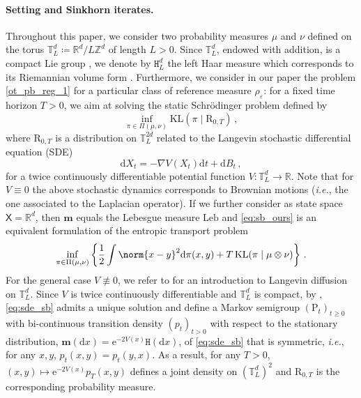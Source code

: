 \documentclass[final,12pt]{colt2023} %
\def\msx{\mathsf{X}}
\def\rset{\mathbb{R}}
\def\ie{\textit{i.e.}}
\newcommand{\bbRD}{\mathbb{R}^d}
\newcommand{\De}{\mathrm{d}}
\newcommand{\rmP}{\mathrm{P}}
\newcommand{\rmR}{\mathrm{R}}
\newcommand{\rme}{\mathrm{e}}
\def\torus{\tset}
\def\torusL{\torus_L}
\def\Haar{\mathtt{H}}
\def\HaarL{\Haar_L}
\newcommand{\defEns}[1]{\left\lbrace #1 \right\rbrace }
\def\rset{\mathbb{R}}
\def\tset{\mathbb{T}}
\def\ie{\textit{i.e.}}
\def\bfm{\mathbf{m}}
\def\rmd{\mathrm{d}}
\def\Leb{\mathrm{Leb}}
\begin{document}
\paragraph{Setting and Sinkhorn iterates.}Throughout this paper, we consider two probability measures $\mu$ and $\nu$ defined on the torus $\mathbb{T}_L^d\coloneqq \bbRD /L\mathbb{Z}^d$ of length $L >0$. Since $\torus_L^d$, endowed with addition, is a compact Lie group \cite[Chapter 15]{bump2013lie}, we denote by $\HaarL^d$ the left Haar measure which corresponds to its Riemannian volume form \cite[Chapter 11.4]{folland2013real}. Furthermore, we consider in our paper the problem \eqref{ot_pb_reg_1} for a particular class of reference measure $\rho_{\varepsilon}$:  for a 
fixed time horizon $T>0$, we aim at solving the static Schr\"odinger problem defined by
\begin{equation}\label{eq:sb_ours}
    \inf_{\pi \in \Pi(\mu, \nu)}\mathrm{KL}(\pi \mid \rmR_{0,T}) \, ,
\end{equation}
where $\rmR_{0,T}$ is a distribution on $\tset^{2d}_L$  related to the Langevin stochastic differential equation (SDE) 
\begin{equation}\label{eq:sde_sb}
    \De X_t = -\nabla V(X_t)\De t + \De B_t \,,
\end{equation}
for a twice continuously differentiable potential function $V: \mathbb{T}_L^d \to \mathbb{R}$. Note that for $V\equiv 0$ the above stochastic dynamics corresponds to Brownian motions (\ie, the one associated to the Laplacian operator). If we further consider as state space $\msx = \rset^d$, then $\bfm$ equals the Lebesgue measure $\Leb$ and  \eqref{eq:sb_ours} is an equivalent formulation of the entropic transport problem
\begin{align}\label{ot_pb_reg_our}
    \inf_{\pi \in \Pi(\mu, \nu)}\defEns{\frac12\int \norm{x-y}^2 \De \pi(x,y) + T\,\mathrm{KL}(\pi \mid \mu \otimes \nu)  } \, .
\end{align}
For the general case $V\not \equiv 0$, we refer to  \cite{garcia2019langevin} for an introduction to Langevin diffusion on $\torusL^d$.
Since $V$ is twice continuously differentiable and $\torusL^d$ is compact, by \cite[Theorem 10.1]{kent1978time}, \eqref{eq:sde_sb} admits a unique solution and define a Markov semigroup $(\rmP_t)_{t \geq 0}$ with bi-continuous transition density $(p_t)_{t > 0}$  with respect to the stationary distribution, $\bfm(\rmd x) = \rme^{-2V(x)} \Haar(\rmd x)$, of \eqref{eq:sde_sb} that is symmetric, \ie, for any $x,y$, 
$p_t(x,y) = p_t(y,x)$. As a result, for any $T >0$, $(x,y) \mapsto  \rme^{-2V(x)} p_T(x,y)$ defines a joint density on $(\torusL^{d})^2$ and $\rmR_{0,T}$ is the corresponding probability measure.
\end{document}
